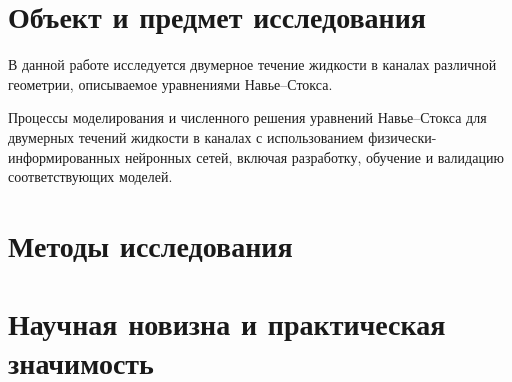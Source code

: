 \section{Объект и предмет исследования}
В данной работе исследуется двумерное течение жидкости в каналах различной геометрии,
описываемое уравнениями Навье–Стокса.

Процессы моделирования и численного решения уравнений Навье–Стокса для двумерных течений
жидкости в каналах с использованием физически-информированных нейронных сетей, включая
разработку, обучение и валидацию соответствующих моделей.

\section{Методы исследования}

\section{Научная новизна и практическая значимость}







